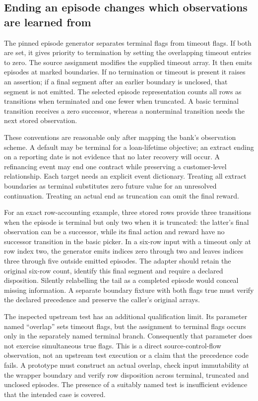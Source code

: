 \subsection{Ending an episode changes which observations are learned from}

The pinned episode generator separates terminal flags from timeout flags.
If both are set, it gives priority to termination by setting the overlapping
timeout entries to zero. The source assignment modifies the supplied timeout
array. It then emits episodes at marked boundaries. If no termination or
timeout is present it raises an assertion; if a final segment after an earlier
boundary is unclosed, that segment is not emitted. The selected episode
representation counts all rows as transitions when terminated and one fewer
when truncated. A basic terminal transition receives a zero successor, whereas
a nonterminal transition needs the next stored observation.
\citep{exec15_d3rlpy_episode}

These conventions are reasonable only after mapping the bank's observation
scheme. A default may be terminal for a loan-lifetime objective; an extract
ending on a reporting date is not evidence that no later recovery will occur.
A refinancing event may end one contract while preserving a customer-level
relationship. Each target needs an explicit event dictionary. Treating all
extract boundaries as terminal substitutes zero future value for an unresolved
continuation. Treating an actual end as truncation can omit the final reward.
\citep{exec15_d3rlpy_contract}

For an exact row-accounting example, three stored rows provide three
transitions when the episode is terminal but only two when it is truncated:
the latter's final observation can be a successor, while its final action and
reward have no successor transition in the basic picker. In a six-row input
with a timeout only at row index two, the generator emits indices zero through
two and leaves indices three through five outside emitted episodes. The
adapter should retain the original six-row count, identify this final segment
and require a declared disposition. Silently relabelling the tail as a
completed episode would conceal missing information. A separate boundary
fixture with both flags true must verify the declared precedence and preserve
the caller's original arrays. \citep{exec15_d3rlpy_exact,exec15_d3rlpy_contract}

The inspected upstream test has an additional qualification limit. Its
parameter named ``overlap'' sets timeout flags, but the assignment to terminal
flags occurs only in the separately named terminal branch. Consequently that
parameter does not exercise simultaneous true flags. This is a direct
source-control-flow observation, not an upstream test execution or a claim
that the precedence code fails. A prototype must construct an actual overlap,
check input immutability at the wrapper boundary and verify row disposition
across terminal, truncated and unclosed episodes. The presence of a suitably
named test is insufficient evidence that the intended case is covered.
\citep{exec15_d3rlpy_episode,exec15_d3rlpy_contract}

